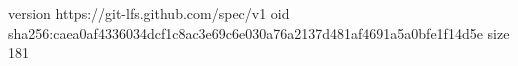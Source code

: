 version https://git-lfs.github.com/spec/v1
oid sha256:caea0af4336034dcf1c8ac3e69c6e030a76a2137d481af4691a5a0bfe1f14d5e
size 181
